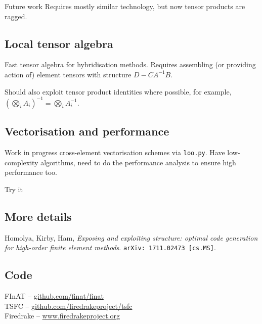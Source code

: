 \documentclass[cmyk,luatex,a0paper,portrait]{baposter}
\begin{document}
\begin{poster}
\begin{posterbox}[name=future, column=0, below=rules,
    span=3, height=0.235]{Future work}
    Requires mostly similar technology, but now tensor products are
    ragged.
    \vspace{-\baselineskip}
    \subsection*{Local tensor algebra}
    \vspace{-0.35\baselineskip}
    Fast tensor algebra for hybridisation methods.  Requires
    assembling (or providing action of) element tensors with
    structure $D - C A^{-1} B$.

    Should also exploit tensor product identities where possible,
    for example,
    $\left(\bigotimes_i A_i\right)^{-1} = \bigotimes_i A_i^{-1}$.
    \vspace{-\baselineskip}
    \subsection*{Vectorisation and performance}
    \vspace{-0.35\baselineskip}
    Work in progress cross-element vectorisation schemes via
    \texttt{loo.py}.  Have low-complexity algorithms, need to do
    the performance analysis to ensure high performance too.
  \end{posterbox}    
  \begin{posterbox}[name=try, column=3, below=curl-curl,
    span=3, height=0.235]{Try it}
    \raggedright
    \subsection*{More details}
    \vspace{-0.35\baselineskip}
    Homolya, Kirby, Ham, \emph{Exposing and exploiting structure:
      optimal code generation for high-order finite element
      methods}. \texttt{arXiv:\,1711.02473\,[cs.MS]}.
    \vspace{-\baselineskip}
    \subsection*{Code}
    \vspace{-0.35\baselineskip}
    FInAT -- \url{github.com/finat/finat}\\[0.25\baselineskip]
    TSFC -- \url{github.com/firedrakeproject/tsfc}\\[0.25\baselineskip]
    Firedrake -- \url{www.firedrakeproject.org}


\end{posterbox}
\end{poster}
\end{document}
